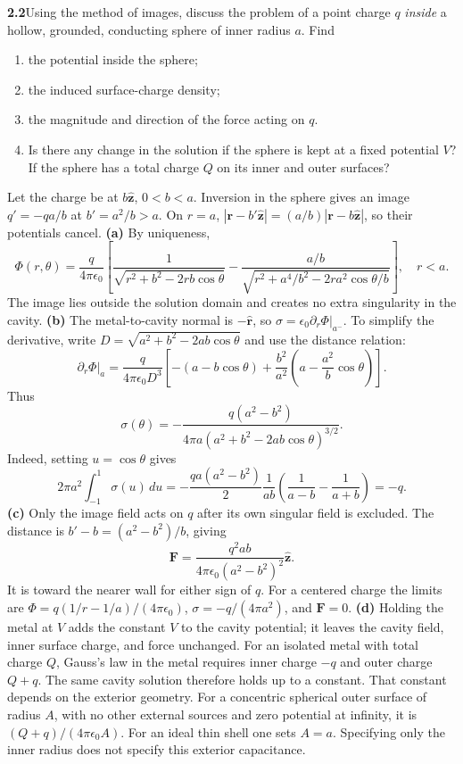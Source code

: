 \par\bigskip
\noindent\textbf{2.2}\quad Using the method of images, discuss the problem of a point charge $q$ \emph{inside} a hollow, grounded, conducting sphere of inner radius $a$. Find
\begin{enumerate}
\item[(a)] the potential inside the sphere;
\item[(b)] the induced surface-charge density;
\item[(c)] the magnitude and direction of the force acting on $q$.
\item[(d)] Is there any change in the solution if the sphere is kept at a fixed potential $V$? If the sphere has a total charge $Q$ on its inner and outer surfaces?
\end{enumerate}
\solution
Let the charge be at $b\widehat{\mathbf z}$, $0<b<a$. Inversion in the
sphere gives an image $q'=-qa/b$ at $b'=a^2/b>a$. On $r=a$,
$|\mathbf r-b'\widehat{\mathbf z}|=(a/b)
 |\mathbf r-b\widehat{\mathbf z}|$, so their potentials cancel.
\textbf{(a)} By uniqueness,
\[
\boxed{\Phi(r,\theta)=\frac{q}{4\pi\epsilon _0}
 \left[\frac1{\sqrt{r^2+b^2-2rb\cos\theta}}
 -\frac{a/b}{\sqrt{r^2+a^4/b^2-2ra^2\cos\theta/b}}\right],\quad r<a.}
\]
The image lies outside the solution domain and creates no extra
singularity in the cavity.
\textbf{(b)} The metal-to-cavity normal is $-\widehat{\mathbf r}$,
so $\sigma=\epsilon _0\partial_r\Phi|_{a^-}$. To simplify the derivative,
write $D=\sqrt{a^2+b^2-2ab\cos\theta}$ and use the distance relation:
\[
\partial_r\Phi|_a=\frac{q}{4\pi\epsilon _0D^3}
 \left[-(a-b\cos\theta)+\frac{b^2}{a^2}
              \left(a-\frac{a^2}{b}\cos\theta\right)\right].
\]
Thus
\[
\boxed{\sigma(\theta)=-\frac{q(a^2-b^2)}
 {4\pi a(a^2+b^2-2ab\cos\theta)^{3/2}}.}
\]
Indeed, setting $u=\cos\theta$ gives
\[
2\pi a^2\int_{-1}^1\sigma(u)\,du
=-\frac{qa(a^2-b^2)}2\frac1{ab}
 \left(\frac1{a-b}-\frac1{a+b}\right)=-q.
\]
\textbf{(c)} Only the image field acts on $q$ after its own singular
field is excluded. The distance is $b'-b=(a^2-b^2)/b$, giving
\[
\boxed{\mathbf F=\frac{q^2ab}{4\pi\epsilon _0(a^2-b^2)^2}
                    \widehat{\mathbf z}.}
\]
It is toward the nearer wall for either sign of $q$.
For a centered charge the limits are
$\Phi=q(1/r-1/a)/(4\pi\epsilon _0)$,
$\sigma=-q/(4\pi a^2)$, and $\mathbf F=0$.
\textbf{(d)} Holding the metal at $V$ adds the constant $V$ to the
cavity potential; it leaves the cavity field, inner surface charge,
and force unchanged. For an isolated metal with total charge $Q$,
Gauss's law in the metal requires inner charge $-q$ and outer charge
$Q+q$. The same cavity solution therefore holds up to a constant.
That constant depends on the exterior geometry. For a concentric
spherical outer surface of radius $A$, with no other external sources
and zero potential at infinity, it is $(Q+q)/(4\pi\epsilon _0A)$.
For an ideal thin shell one sets $A=a$. Specifying only the inner
radius does not specify this exterior capacitance.


